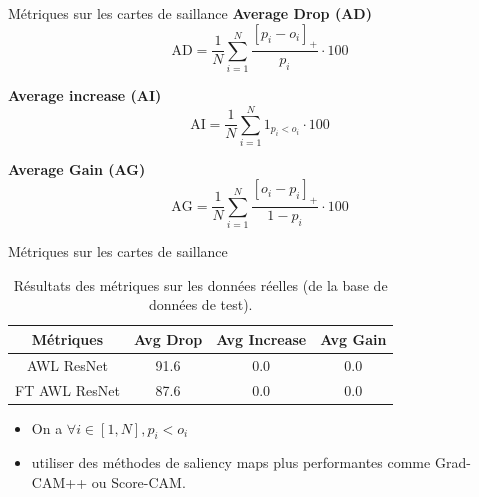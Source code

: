 \documentclass[11pt]{beamer}
\begin{document}
\begin{frame}{Métriques sur les cartes de saillance}
    \textbf{Average Drop (AD)}
    \begin{equation}
        \text{AD} = \frac{1}{N} \sum_{i=1}^{N} \frac{[p_i - o_i]_+}{p_i} \cdot 100
    \end{equation}
    
    \textbf{Average increase (AI)}
    \begin{equation}
        \text{AI} = \frac{1}{N} \sum_{i=1}^{N} 1_{p_i<o_i} \cdot 100
    \end{equation}
    
    \textbf{Average Gain (AG)}
    \begin{equation}
        \text{AG} = \frac{1}{N} \sum_{i=1}^{N} \frac{[o_i - p_i]_+}{1 - p_i} \cdot 100
    \end{equation}
\end{frame}

\begin{frame}{Métriques sur les cartes de saillance}
    \begin{table}[ht]
        \centering
        \begin{tabular}{cccc}
            \toprule
            Métriques & Avg Drop & Avg Increase & Avg Gain \\
            \midrule
            AWL ResNet & 91.6 & 0.0& 0.0\\
            FT AWL ResNet & 87.6 & 0.0 & 0.0\\
            \bottomrule
            \end{tabular}
        \caption{Résultats des métriques sur les données réelles (de la base de données de test).}
        \label{tab:saliency_results}
    \end{table}

    \begin{itemize}
        \item On a $\forall i \in [1, N], p_i < o_i$
        \item utiliser des méthodes de saliency maps plus performantes comme Grad-CAM++ ou Score-CAM.
    \end{itemize}
\end{frame}
\end{document}
